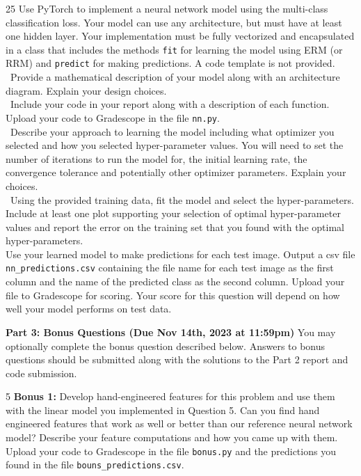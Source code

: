 \documentclass[11pt]{article}
\begin{document}
\begin{problem}{25} Use PyTorch to implement a neural network model using the multi-class classification loss. 
    Your model can use any architecture, but must have at least one hidden layer. Your implementation must be fully vectorized and encapsulated in a class that includes the methods \verb|fit| for learning the model using ERM (or RRM) and \verb|predict| for making predictions. A code template is not provided.\\ 

     ~Provide a mathematical description of your model along with an architecture diagram. Explain your design choices.\\ 
        
     ~Include your code in your report along with a description of each function. Upload your code to Gradescope in the file \verb|nn.py|.\\ 

     ~Describe your approach to learning the model including what optimizer you selected and how you selected hyper-parameter values. You will need to set the number of iterations to run the model for, the initial learning rate, the convergence tolerance and potentially other optimizer parameters. Explain your choices.\\

     ~Using the provided training data, fit the model and select the hyper-parameters. Include at least one plot supporting your selection of optimal hyper-parameter values and report the error on the training set that you found with the optimal hyper-parameters.\\

     Use your learned model to make predictions for each test image. Output a csv file \verb|nn_predictions.csv| containing the file name for each test image as the first column and the name of the predicted class as the second column. Upload your file to Gradescope for scoring. Your score for this question will depend on how well your model performs on test data.\\
\end{problem}

\textbf{Part 3: Bonus Questions (Due Nov 14th, 2023 at 11:59pm)} 
You may optionally complete the bonus question described below. Answers to bonus questions should be submitted along with the solutions to the Part 2 report and code submission.\\

\begin{problem}{5}
\textbf{Bonus 1:} Develop hand-engineered features for this problem and use them with the linear model you implemented in Question 5. Can you find hand engineered features that work as well or better than our reference neural network model? Describe your feature computations and how you came up with them. Upload your code to Gradescope in the file \verb|bonus.py| and the predictions you found in the file \verb|bouns_predictions.csv|.
\end{problem}

\showpoints
\end{document}
